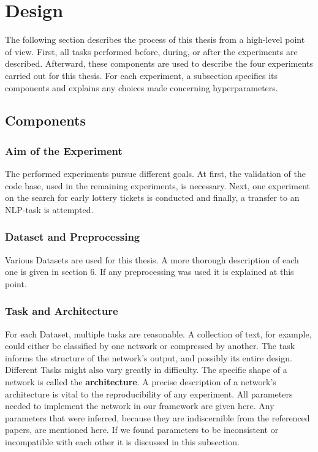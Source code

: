 \chapter{Design}
\label{ch:design}

The following section describes the process of this thesis from a high-level point of view. First, all tasks performed before, during, or after the experiments are described. Afterward, these components are used to describe the four experiments carried out for this thesis. For each experiment, a subsection specifies its components and explains any choices made concerning hyperparameters.

\section{Components}
\subsection*{Aim of the Experiment}
The performed experiments pursue different goals. At first, the validation of the code base, used in the remaining experiments, is necessary. Next, one experiment on the search for early lottery tickets is conducted and finally, a transfer to an NLP-task is attempted.
\subsection*{Dataset and Preprocessing}
Various Datasets are used for this thesis. A more thorough description of each one is given in section 6. If any preprocessing was used it is explained at this point.
\subsection*{Task and Architecture}
For each Dataset, multiple tasks are reasonable. A collection of text, for example, could either be classified by one network or compressed by another. The task informs the structure of the network's output, and possibly its entire design. Different Tasks might also vary greatly in difficulty.
The specific shape of a network is called the \textbf{architecture}. A precise description of a network's architecture is vital to the reproducibility of any experiment. All parameters needed to implement the network in our framework are given here. Any parameters that were inferred,  because they are indiscernible from the referenced papers, are mentioned here. If we found parameters to be inconsistent or incompatible with each other it is discussed in this subsection.


